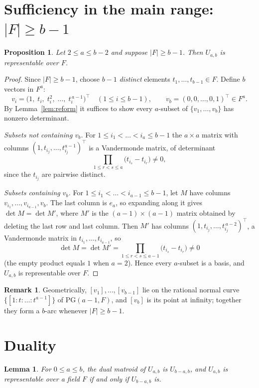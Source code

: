 \documentclass{amsart}
\newtheorem{lemma}{Lemma}
\newtheorem{proposition}{Proposition}
\theoremstyle{definition}
\newtheorem{remark}{Remark}
\begin{document}
\section{Sufficiency in the main range: $|F|\ge b-1$}

\begin{proposition}\label{prop:suff}
Let $2\le a\le b-2$ and suppose $|F|\ge b-1$. Then $U_{a,b}$ is representable over
$F$.
\end{proposition}

\begin{proof}
Since $|F|\ge b-1$, choose $b-1$ \emph{distinct} elements
$t_1,\dots,t_{b-1}\in F$. Define $b$ vectors in $F^a$:
\[
v_i=\bigl(1,\;t_i,\;t_i^2,\;\dots,\;t_i^{\,a-1}\bigr)^{\!\top}
\quad(1\le i\le b-1),
\qquad
v_b=(0,0,\dots,0,1)^{\!\top}\in F^a .
\]
By Lemma~\ref{lem:reform} it suffices to show every $a$-subset of
$\{v_1,\dots,v_b\}$ has nonzero determinant.

\emph{Subsets not containing $v_b$.} For $1\le i_1<\dots<i_a\le b-1$ the
$a\times a$ matrix with columns $(1,t_{i_j},\dots,t_{i_j}^{a-1})^\top$ is a
Vandermonde matrix, of determinant
\[
\prod_{1\le r<s\le a}\bigl(t_{i_s}-t_{i_r}\bigr)\ne0,
\]
since the $t_{i_j}$ are pairwise distinct.

\emph{Subsets containing $v_b$.} For $1\le i_1<\dots<i_{a-1}\le b-1$, let $M$ have
columns $v_{i_1},\dots,v_{i_{a-1}},v_b$. The last column is $e_a$, so expanding
along it gives $\det M=\det M'$, where $M'$ is the $(a-1)\times(a-1)$ matrix
obtained by deleting the last row and last column. Then $M'$ has columns
$(1,t_{i_j},\dots,t_{i_j}^{\,a-2})^\top$, a Vandermonde matrix in
$t_{i_1},\dots,t_{i_{a-1}}$, so
\[
\det M=\det M'=\prod_{1\le r<s\le a-1}\bigl(t_{i_s}-t_{i_r}\bigr)\ne0
\]
(the empty product equals $1$ when $a=2$). Hence every $a$-subset is a basis, and
$U_{a,b}$ is representable over $F$.
\end{proof}

\begin{remark}
Geometrically, $[v_1],\dots,[v_{b-1}]$ lie on the rational normal curve
$\{[1:t:\dots:t^{a-1}]\}$ of $\mathrm{PG}(a-1,F)$, and $[v_b]$ is its point at
infinity; together they form a $b$-arc whenever $|F|\ge b-1$.
\end{remark}

\section{Duality}

\begin{lemma}\label{lem:dual}
For $0\le a\le b$, the dual matroid of $U_{a,b}$ is $U_{b-a,b}$, and $U_{a,b}$ is
representable over a field $F$ if and only if $U_{b-a,b}$ is.
\end{lemma}
\end{document}
